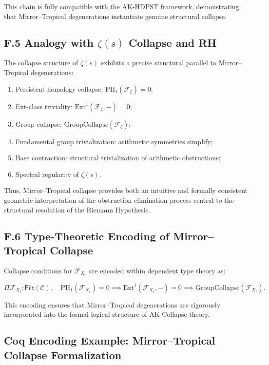 \documentclass[11pt]{article}
\begin{document}
This chain is fully compatible with the AK-HDPST framework, demonstrating that Mirror–Tropical degenerations instantiate genuine structural collapse.

\subsection*{F.5 Analogy with $\zeta(s)$ Collapse and RH}

The collapse structure of $\zeta(s)$ exhibits a precise structural parallel to Mirror–Tropical degenerations:

\begin{enumerate}
    \item Persistent homology collapse: $\mathrm{PH}_1(\mathcal{F}_{\zeta}) = 0$;
    \item Ext-class triviality: $\mathrm{Ext}^1(\mathcal{F}_{\zeta}, -) = 0$;
    \item Group collapse: $\mathrm{GroupCollapse}(\mathcal{F}_{\zeta})$;
    \item Fundamental group trivialization: arithmetic symmetries simplify;
    \item Base contraction: structural trivialization of arithmetic obstructions;
    \item Spectral regularity of $\zeta(s)$.
\end{enumerate}

Thus, Mirror–Tropical collapse provides both an intuitive and formally consistent geometric interpretation of the obstruction elimination process central to the structural resolution of the Riemann Hypothesis.

\subsection*{F.6 Type-Theoretic Encoding of Mirror–Tropical Collapse}

Collapse conditions for $\mathcal{F}_{X_t}$ are encoded within dependent type theory as:

\[
\Pi \mathcal{F}_{X_t} : \mathsf{Filt}(\mathcal{C}), \quad 
\mathrm{PH}_1(\mathcal{F}_{X_t}) = 0 \implies 
\mathrm{Ext}^1(\mathcal{F}_{X_t}, -) = 0 \implies 
\mathrm{GroupCollapse}(\mathcal{F}_{X_t}).
\]

This encoding ensures that Mirror–Tropical degenerations are rigorously incorporated into the formal logical structure of AK Collapse theory.

\subsection*{Coq Encoding Example: Mirror–Tropical Collapse Formalization}
\end{document}
